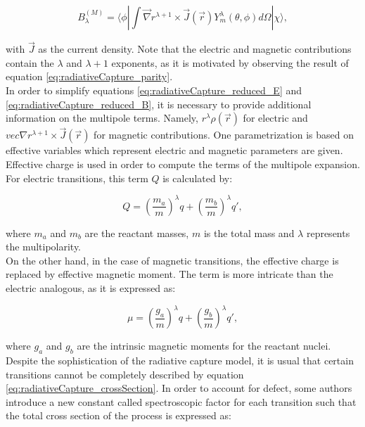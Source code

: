 \documentclass[openany]{book}
\begin{document}
\begin{equation} \label{eq:radiativeCapture_reduced_B}
	B^{(M)}_{\lambda} =  \langle  \phi  |  \int  \vec \nabla r^{\lambda+1} \times \vec J (\vec r) Y^{\lambda}_{m} (\theta, \phi) d \Omega |   \chi  \rangle,  
\end{equation}

with $\vec J$ as the current density.  Note that the electric and magnetic contributions contain the $\lambda$ and $\lambda + 1$ exponents, as it is motivated by observing the result of equation \ref{eq:radiativeCapture_parity}. \\

In order to simplify equations \ref{eq:radiativeCapture_reduced_E} and 
\ref{eq:radiativeCapture_reduced_B}, it is necessary to provide additional information on the multipole terms. Namely, $  r^\lambda \rho(\vec r)$ for electric and $vec \nabla r^{\lambda+1} \times \vec J (\vec r)$ for magnetic contributions. One parametrization is based on effective variables which represent electric and magnetic parameters are given. Effective charge is used in order to compute the terms of the multipole expansion. For electric transitions, this term $Q$ is calculated by:

\begin{equation} \label{eq:radiativeCapture_Electric_charge}
	Q =  \left(\frac{m_a}{m}\right)^{\lambda}q + \left(\frac{m_b}{m}\right)^{\lambda}q',
\end{equation}

where $m_a$ and $m_b$ are the reactant masses, $m$ is the total mass and $\lambda$ represents the multipolarity. \\

On the other hand, in the case of magnetic transitions, the effective charge is replaced by effective magnetic moment.
The term is more intricate than the electric analogous, as it is expressed as: 

\begin{equation} \label{eq:radiativeCapture_Magnetic_moment}
	\mu =  \left(\frac{g_a}{m}\right)^{\lambda}q + \left(\frac{g_b}{m}\right)^{\lambda}q',
\end{equation}

where $g_a$ and $g_b$ are the intrinsic magnetic moments for the reactant nuclei. \\

Despite the sophistication of the radiative capture model, it is usual that certain transitions cannot be completely described by equation \ref{eq:radiativeCapture_crossSection}. In order to account for defect, some authors introduce a new constant called spectroscopic factor for each transition such that the total cross section of the process is expressed as: 
\end{document}
